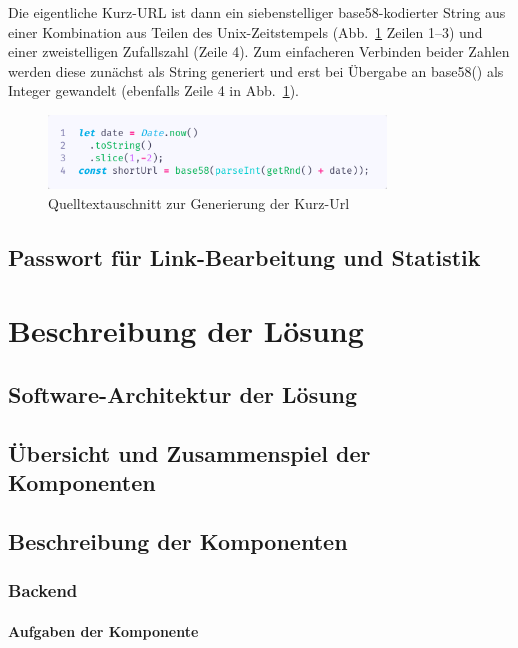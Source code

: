 \documentclass[a4paper,11pt,DIV=12,overfullrule=on]{scrreprt}
\begin{document}
Die eigentliche Kurz-URL ist dann ein siebenstelliger base58-kodierter String aus einer Kombination aus Teilen des Unix-Zeitstempels (Abb.~\ref{fig:261shorturl} Zeilen 1–3) und einer zweistelligen Zufallszahl (Zeile 4). Zum einfacheren Verbinden beider Zahlen werden diese zunächst als String generiert und erst bei Übergabe an {\ttfamily base58()} als Integer gewandelt (ebenfalls Zeile 4 in Abb.~\ref{fig:261shorturl}).
\begin{figure}%
    \begin{small}%
        \begin{center}%
            \includegraphics[width=0.8\textwidth]{2_6_1_shortUrl.png}%
        \end{center}%
        \caption{Quelltextauschnitt zur Generierung der Kurz-Url}%
        \label{fig:261shorturl}%
    \end{small}%
\end{figure}%


\section{Passwort für Link-Bearbeitung und Statistik}


\chapter{Beschreibung der Lösung}
\section{Software-Architektur der Lösung}
\section{Übersicht und Zusammenspiel der Komponenten}
\section{Beschreibung der Komponenten}
\subsection{Backend}
\subsubsection{Aufgaben der Komponente}
\end{document}
